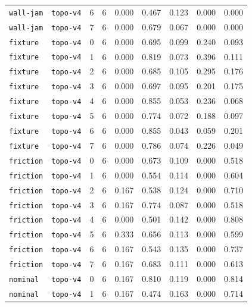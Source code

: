 \documentclass{article}
\begin{document}
\begin{center}
\begin{tabular}{lllcccccc}
\texttt{wall-jam} & \texttt{topo-v4} & 6 & 6 & 0.000 & 0.467 & 0.123 & 0.000 & 0.000 \\
\texttt{wall-jam} & \texttt{topo-v4} & 7 & 6 & 0.000 & 0.679 & 0.067 & 0.000 & 0.000 \\
\texttt{fixture} & \texttt{topo-v4} & 0 & 6 & 0.000 & 0.695 & 0.099 & 0.240 & 0.093 \\
\texttt{fixture} & \texttt{topo-v4} & 1 & 6 & 0.000 & 0.819 & 0.073 & 0.396 & 0.111 \\
\texttt{fixture} & \texttt{topo-v4} & 2 & 6 & 0.000 & 0.685 & 0.105 & 0.295 & 0.176 \\
\texttt{fixture} & \texttt{topo-v4} & 3 & 6 & 0.000 & 0.697 & 0.095 & 0.201 & 0.175 \\
\texttt{fixture} & \texttt{topo-v4} & 4 & 6 & 0.000 & 0.855 & 0.053 & 0.236 & 0.068 \\
\texttt{fixture} & \texttt{topo-v4} & 5 & 6 & 0.000 & 0.774 & 0.072 & 0.188 & 0.097 \\
\texttt{fixture} & \texttt{topo-v4} & 6 & 6 & 0.000 & 0.855 & 0.043 & 0.059 & 0.201 \\
\texttt{fixture} & \texttt{topo-v4} & 7 & 6 & 0.000 & 0.786 & 0.074 & 0.226 & 0.049 \\
\texttt{friction} & \texttt{topo-v4} & 0 & 6 & 0.000 & 0.673 & 0.109 & 0.000 & 0.518 \\
\texttt{friction} & \texttt{topo-v4} & 1 & 6 & 0.000 & 0.554 & 0.114 & 0.000 & 0.604 \\
\texttt{friction} & \texttt{topo-v4} & 2 & 6 & 0.167 & 0.538 & 0.124 & 0.000 & 0.710 \\
\texttt{friction} & \texttt{topo-v4} & 3 & 6 & 0.167 & 0.774 & 0.087 & 0.000 & 0.518 \\
\texttt{friction} & \texttt{topo-v4} & 4 & 6 & 0.000 & 0.501 & 0.142 & 0.000 & 0.808 \\
\texttt{friction} & \texttt{topo-v4} & 5 & 6 & 0.333 & 0.656 & 0.113 & 0.000 & 0.599 \\
\texttt{friction} & \texttt{topo-v4} & 6 & 6 & 0.167 & 0.543 & 0.135 & 0.000 & 0.737 \\
\texttt{friction} & \texttt{topo-v4} & 7 & 6 & 0.167 & 0.683 & 0.111 & 0.000 & 0.613 \\
\texttt{nominal} & \texttt{topo-v4} & 0 & 6 & 0.167 & 0.810 & 0.119 & 0.000 & 0.814 \\
\texttt{nominal} & \texttt{topo-v4} & 1 & 6 & 0.167 & 0.474 & 0.163 & 0.000 & 0.714 \\
\bottomrule
\end{tabular}
\end{center}
\end{document}
